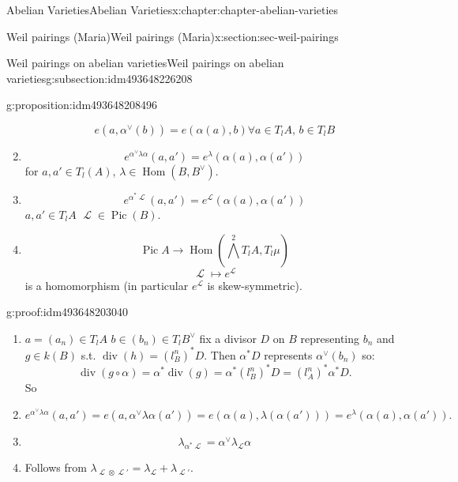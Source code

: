 \documentclass[oneside,10pt,]{book}
\numberwithin{equation}{section}
\newcommand{\sheaf}[1]{\operatorname{\mathcal{#1}}}
\DeclareMathOperator{\Hom}{Hom}
\DeclareMathOperator{\divisor}{div}
\DeclareMathOperator{\Pic}{Pic}
\begin{document}
\begin{chapterptx}{Abelian Varieties}{}{Abelian Varieties}{}{}{x:chapter:chapter-abelian-varieties}
\begin{sectionptx}{Weil pairings (Maria)}{}{Weil pairings (Maria)}{}{}{x:section:sec-weil-pairings}
\begin{subsectionptx}{Weil pairings on abelian varieties}{}{Weil pairings on abelian varieties}{}{}{g:subsection:idm493648226208}
\begin{proposition}{}{}{g:proposition:idm493648208496}
\begin{enumerate}
\begin{equation*}
e(a,\alpha^\vee(b)) = e(\alpha (a), b) \forall a \in T_lA,\,b\in T_l B
\end{equation*}
%
\item{}%
\begin{equation*}
e^{\alpha^\vee \lambda \alpha}(a,a') = e ^\lambda (\alpha(a), \alpha(a'))
\end{equation*}
for \(a,a' \in T_l(A)\), \(\lambda \in \Hom(B,B^\vee)\).%
\item{}%
\begin{equation*}
e^{\alpha^* \sheaf L} (a,a') = e^{\sheaf L}(\alpha (a),\alpha(a'))
\end{equation*}
\(a,a'\in T_lA\) \(\sheaf L\in \Pic(B)\).%
\item{}%
\begin{equation*}
\Pic A  \to \Hom( \bigwedge^2 T_lA , T_l\mu)
\end{equation*}
%
\begin{equation*}
\sheaf L \mapsto e^{\sheaf L}
\end{equation*}
is a homomorphism (in particular \(e^{\sheaf L}\) is  skew-symmetric).%
\end{enumerate}
%
\end{proposition}
\begin{proofptx}{}{g:proof:idm493648203040}
%
\begin{enumerate}
\item{}\(a = (a_n) \in T_lA\) \(b\in (b_n) \in T_l B^\vee\) fix a divisor \(D \) on \(B\) representing \(b_n\) and \(g\in k(B)\) s.t. \(\divisor (h) = (l^n_B)^* D\). Then \(\alpha^* D\) represents \(\alpha^\vee(b_n)\) so:%
\begin{equation*}
\divisor(g\circ \alpha) = \alpha^*\divisor (g) = \alpha^*(l^n_B)^* D = (l_A^n)^* \alpha^* D\text{.}
\end{equation*}
So%
\item{}%
\begin{equation*}
e^{\alpha^{\vee}\lambda \alpha} (a,a') = e(a, \alpha^\vee\lambda \alpha(a')) = e(\alpha(a),\lambda (\alpha(a'))) = e^\lambda (\alpha(a), \alpha(a'))\text{.}
\end{equation*}
%
\item{}%
\begin{equation*}
\lambda_{\alpha^* \sheaf L} = \alpha^\vee \lambda_{\sheaf L} \alpha
\end{equation*}
%
\item{}Follows from \(\lambda_{\sheaf L\otimes \sheaf L'} = \lambda_{\sheaf L} + \lambda_{\sheaf L'}\).%
\end{enumerate}

\end{proofptx}
\end{subsectionptx}
\end{sectionptx}
\end{chapterptx}
\end{document}
